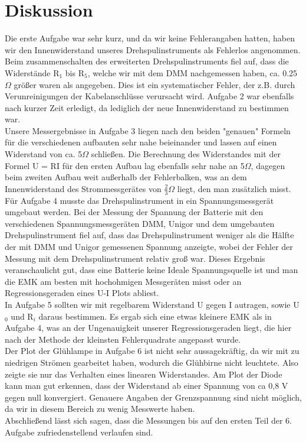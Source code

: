 \documentclass[12pt]{scrartcl}
\begin{document}
\newpage

\section{Diskussion}

Die erste Aufgabe war sehr kurz, und da wir keine Fehlerangaben hatten, haben wir den Innenwiderstand unseres Drehspulinstruments als Fehlerlos angenommen.\\
Beim zusammenschalten des erweiterten Drehspulinstruments fiel auf, dass die Widerstände R$_1$ bis R$_5$, welche wir mit dem DMM nachgemessen haben, ca. 0.25$\Omega$ größer waren als angegeben. Dies ist ein systematischer Fehler, der z.B. durch Verunreinigungen der Kabelanschlüsse verursacht wird. Aufgabe 2 war ebenfalls nach kurzer Zeit erledigt, da lediglich der neue Innenwiderstand zu bestimmen war.\\
Unsere Messergebnisse in Aufgabe 3 liegen nach den beiden "genauen" Formeln für die verschiedenen aufbauten sehr nahe beieinander und lassen auf einen Widerstand von ca. 5$\Omega$ schließen. Die Berechnung des Widerstandes mit der Formel U = RI für den ersten Aufbau lag ebenfalls sehr nahe an 5$\Omega$, dagegen beim zweiten Aufbau weit außerhalb der Fehlerbalken, was an dem Innenwiderstand des Strommessgerätes von $\frac{2}{3}\Omega$ liegt, den man zusätzlich misst.\\
Für Aufgabe 4 musste das Drehspulinstrument in ein Spannungsmessgerät umgebaut werden. Bei der Messung der Spannung der Batterie mit den verschiedenen Spannungsmessgeräten DMM, Unigor und dem umgebauten Drehspulinstrument fiel auf, dass das Drehspulinstrument weniger als die Hälfte der mit DMM und Unigor gemessenen Spannung anzeigte, wobei der Fehler der Messung mit dem Drehspulinstrument relativ groß war. Dieses Ergebnis veranschaulicht gut, dass eine Batterie keine Ideale Spannungsquelle ist und man die EMK am besten mit hochohmigen Messgeräten misst oder an Regressionsgeraden eines U-I Plots abliest.\\
In Aufgabe 5 sollten wir mit regelbarem Widerstand U gegen I autragen, sowie U$_0$ und R$_i$ daraus bestimmen. Es ergab sich eine etwas kleinere EMK als in Aufgabe 4, was an der Ungenauigkeit unserer Regressionsgeraden liegt, die hier nach der Methode der kleinsten Fehlerquadrate angepasst wurde.\\
Der Plot der Glühlampe in Aufgabe 6 ist nicht sehr aussagekräftig, da wir mit zu niedrigen Strömen gearbeitet haben, wodurch die Glühbirne nicht leuchtete. Also zeigte sie nur das Verhalten eines linearen Widerstandes.
Am Plot der Diode kann man gut erkennen, dass der Widerstand ab einer Spannung von ca 0,8 V gegen null konvergiert. Genauere Angaben der Grenzspannung sind nicht möglich, da wir in diesem Bereich zu wenig Messwerte haben.\\
Abschließend lässt sich sagen, dass die Messungen bis auf den ersten Teil der 6. Aufgabe zufriedenstellend verlaufen sind.

\end{document}
